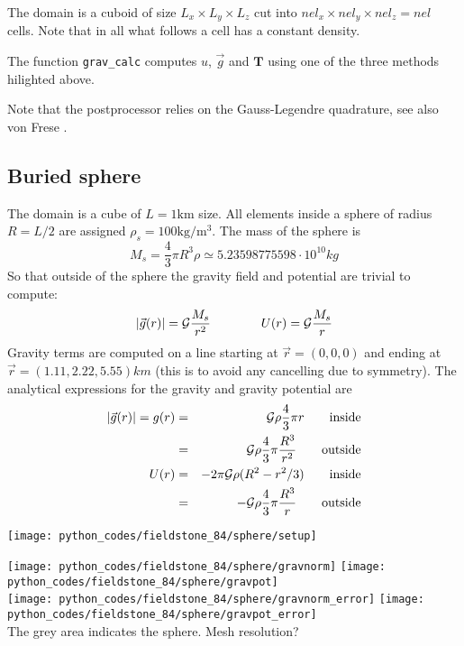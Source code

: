 The domain is a cuboid of size $L_x\times L_y \times L_z$ cut into $nel_x \times nel_y \times nel_z=nel$ cells.
Note that in all what follows a cell has a constant density. 

The function {\tt grav\_calc} computes $u$, $\vec{g}$ and ${\bm T}$ using one of the three methods hilighted above. 

Note that the \aspect postprocessor relies on the Gauss-Legendre quadrature, see also von Frese \etal \cite{vohb81}.

\newpage
\subsection*{Buried sphere}

The domain is a cube of $L=1\si{\km}$ size. All elements inside a sphere of radius $R=L/2$ are assigned
$\rho_s=100\si{\kg\per\cubic\metre}$.
The mass of the sphere is 
\[
M_s = \frac{4}{3}\pi R^3 \rho \simeq 5.23598775598 \cdot 10^{10} \si{kg}
\]
So that outside of the sphere the gravity field and potential are trivial to compute:
\[
|\vec{g}(r)|={\cal G}\frac{M_s}{r^2}
\qquad
\qquad
U(r)={\cal G}\frac{M_s}{r}
\]
Gravity terms are computed on a line starting at $\vec{r}=(0,0,0)$ and ending at $\vec{r}=(1.11,2.22,5.55)\si{km}$ (this is to avoid any cancelling due to symmetry).
The analytical expressions for the gravity and gravity potential are 
\begin{eqnarray}
|\vec{g}(r)|=g(r) 
&=& {\cal G} \rho \frac{4}{3}\pi r \qquad \text{inside} \nonumber\\
&=& {\cal G} \rho \frac{4}{3}\pi \frac{R^3}{r^2}  \qquad \text{outside} \nonumber\\
U(r) 
&=& - 2 \pi {\cal G} \rho (R^2-r^2/3) \qquad \text{inside} \nonumber\\
&=& - {\cal G} \rho \frac{4}{3}\pi \frac{R^3}{r}  \qquad \text{outside} \nonumber
\end{eqnarray}

\begin{center}
\texttt{[image: python\_codes/fieldstone\_84/sphere/setup]}
\end{center}


\begin{center}
\texttt{[image: python\_codes/fieldstone\_84/sphere/gravnorm]}
\texttt{[image: python\_codes/fieldstone\_84/sphere/gravpot]}\\
\texttt{[image: python\_codes/fieldstone\_84/sphere/gravnorm\_error]}
\texttt{[image: python\_codes/fieldstone\_84/sphere/gravpot\_error]}\\
{\captionfont  The grey area indicates the sphere. Mesh resolution?}
\end{center}

